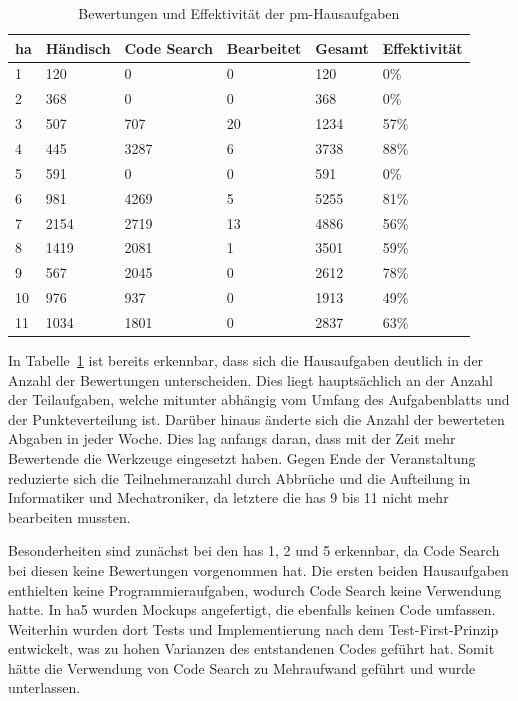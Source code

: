 \begin{table}
    \centering
    \caption{Bewertungen und Effektivität der \ac{pm}-Hausaufgaben}
    \begin{tabular}{|l|l|l|l|l|l|}
    \hline
        \acs{ha} & Händisch & Code Search & Bearbeitet & Gesamt & Effektivität  \\ \hline
        1   & 120  & 0    & 0  & 120  &  0\%  \\ \hline
        2   & 368  & 0    & 0  & 368  &  0\%  \\ \hline
        3   & 507  & 707  & 20 & 1234 & 57\%  \\ \hline
        4   & 445  & 3287 & 6  & 3738 & 88\%  \\ \hline
        5   & 591  & 0    & 0  & 591  &  0\%  \\ \hline
        6   & 981  & 4269 & 5  & 5255 & 81\%  \\ \hline
        7   & 2154 & 2719 & 13 & 4886 & 56\%  \\ \hline
        8   & 1419 & 2081 & 1  & 3501 & 59\%  \\ \hline
        9   & 567  & 2045 & 0  & 2612 & 78\%  \\ \hline
        10  & 976  & 937  & 0  & 1913 & 49\%  \\ \hline
        11  & 1034 & 1801 & 0  & 2837 & 63\%  \\ \hline
    \end{tabular}
    \label{tbl:pm-effectiveness}
\end{table}

In Tabelle~\ref{tbl:pm-effectiveness} ist bereits erkennbar, dass sich die Hausaufgaben deutlich in der Anzahl der Bewertungen unterscheiden.
Dies liegt hauptsächlich an der Anzahl der Teilaufgaben, welche mitunter abhängig vom Umfang des Aufgabenblatts und der Punkteverteilung ist.
Darüber hinaus änderte sich die Anzahl der bewerteten Abgaben in jeder Woche.
Dies lag anfangs daran, dass mit der Zeit mehr Bewertende die Werkzeuge eingesetzt haben.
Gegen Ende der Veranstaltung reduzierte sich die Teilnehmeranzahl durch Abbrüche und die Aufteilung in Informatiker und Mechatroniker, da letztere die \acp{ha} 9 bis 11 nicht mehr bearbeiten mussten.

Besonderheiten sind zunächst bei den \acp{ha} 1, 2 und 5 erkennbar, da Code Search bei diesen keine Bewertungen vorgenommen hat.
Die ersten beiden Hausaufgaben enthielten keine Programmieraufgaben, wodurch Code Search keine Verwendung hatte.
In \ac{ha}5 wurden Mockups angefertigt, die ebenfalls keinen Code umfassen.
Weiterhin wurden dort Tests und Implementierung nach dem Test-First-Prinzip entwickelt, was zu hohen Varianzen des entstandenen Codes geführt hat.
Somit hätte die Verwendung von Code Search zu Mehraufwand geführt und wurde unterlassen.


